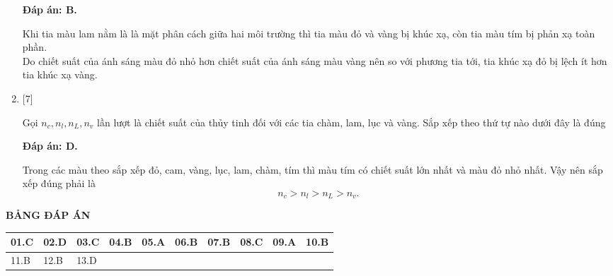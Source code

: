 \begin{enumerate}[label=\bfseries Câu \arabic*:]
	\loigiai
	{		\textbf{Đáp án: B.}
		
Khi tia màu lam nằm là là mặt phân cách giữa hai môi trường thì tia màu đỏ và vàng bị khúc xạ, còn tia màu tím bị phản xạ toàn phần.\\
Do chiết suất của ánh sáng màu đỏ nhỏ hơn chiết suất của ánh sáng màu vàng nên so với phương tia tới, tia khúc xạ đỏ bị lệch ít hơn tia khúc xạ vàng.
		
	}
	
    \item {} [7]
    
	\cauhoi
	{Gọi $n_{c}, n_{l}, n_{L}, n_{v}$ lần lượt là chiết suất của thủy tinh đối với các tia chàm, lam, lục và vàng. Sắp xếp theo thứ tự nào dưới đây là đúng
	}
	
	\loigiai
	{		\textbf{Đáp án: D.}
		
Trong các màu theo sắp xếp đỏ, cam, vàng, lục, lam, chàm, tím thì màu tím có chiết suất lớn nhất và màu đỏ nhỏ nhất. Vậy nên sắp xếp đúng phải là
$$
n_{c} > n_{l} > n_{L} > n_{v}.
$$
		
	}

\end{enumerate}

\loigiai
{
	\begin{center}
		\textbf{BẢNG ĐÁP ÁN}
	\end{center}
	\begin{center}
		\begin{tabular}{|m{2.8em}|m{2.8em}|m{2.8em}|m{2.8em}|m{2.8em}|m{2.8em}|m{2.8em}|m{2.8em}|m{2.8em}|m{2.8em}|}
			\hline
			01.C  & 02.D  & 03.C  & 04.B  & 05.A  & 06.B  & 07.B & 08.C & 09.A & 10.B \\
			\hline
			11.B  & 12.B  & 13.D  &       &       &       &      &      &      &      \\
			\hline
			
		\end{tabular}
	\end{center}
}

